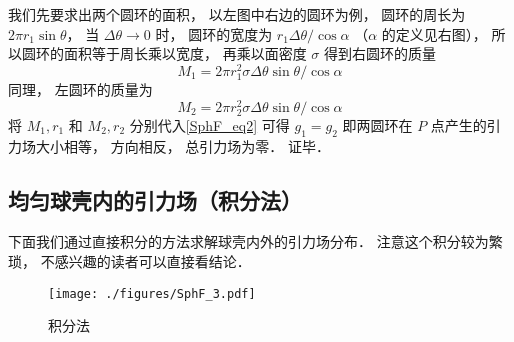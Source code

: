 我们先要求出两个圆环的面积， 以左图中右边的圆环为例， 圆环的周长为 $2\pi r_1\sin\theta$， 当 $\Delta\theta\to 0$ 时， 圆环的宽度为 $r_1\Delta\theta/\cos\alpha$ （$\alpha$ 的定义见右图）， 所以圆环的面积等于周长乘以宽度， 再乘以面密度 $\sigma$ 得到右圆环的质量
\begin{equation}
M_1 = 2\pi r_1^2 \sigma \Delta\theta\sin\theta /\cos\alpha
\end{equation}
同理， 左圆环的质量为
\begin{equation}
M_2 = 2\pi r_2^2 \sigma \Delta\theta\sin\theta /\cos\alpha
\end{equation}
将 $M_1, r_1$ 和 $M_2, r_2$ 分别代入\autoref{SphF_eq2} 可得 $g_1 = g_2$ 即两圆环在 $P$ 点产生的引力场大小相等， 方向相反， 总引力场为零． 证毕．

\subsection{均匀球壳内的引力场（积分法）}
下面我们通过直接积分的方法求解球壳内外的引力场分布． 注意这个积分较为繁琐， 不感兴趣的读者可以直接看结论．

\begin{figure}[ht]
\centering
\texttt{[image: ./figures/SphF\_3.pdf]}
\caption{积分法} \label{SphF_fig3}
\end{figure}

